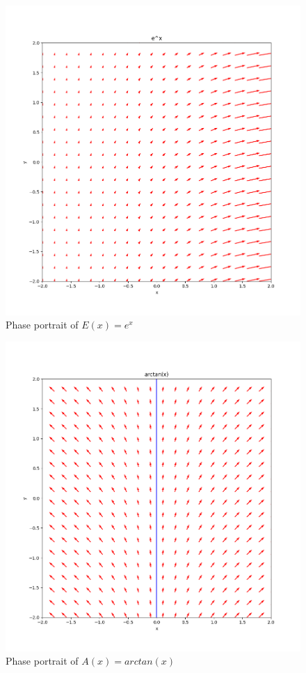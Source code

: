 \documentclass[11pt]{article}
\begin{document}
\begin{figure}[h!]
    \centering
    \includegraphics{phase8.png}
    \caption{Phase portrait of $E(x) = e^x$}
    \label{fig:phase8}
\end{figure}

\begin{figure}[h!]
    \centering
    \includegraphics{phase9.png}
    \caption{Phase portrait of $A(x) = arctan(x)$}
    \label{fig:phase9}
\end{figure}
\end{document}
